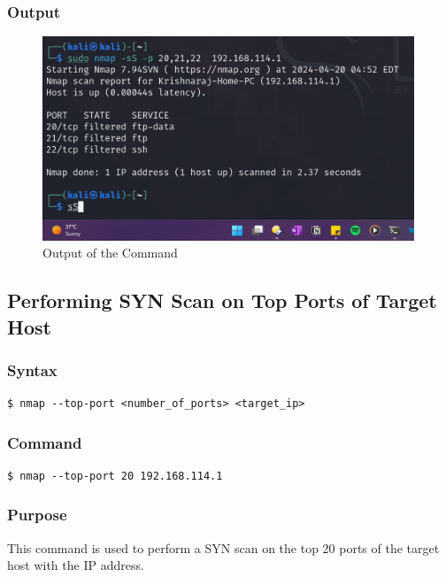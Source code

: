 \documentclass[11pt]{article}
\begin{document}
\subsubsection*{Output}
\begin{figure}[H]
    \centering
    \includegraphics[width=0.99\textwidth]{a3_ss (6).png}
    \caption{Output of the Command}
\end{figure}
\subsection{Performing SYN Scan on Top Ports of Target Host}

\subsubsection*{Syntax}
\begin{verbatim}
$ nmap --top-port <number_of_ports> <target_ip>
\end{verbatim}

\subsubsection*{Command}
\begin{verbatim} 
$ nmap --top-port 20 192.168.114.1
\end{verbatim}

\subsubsection*{Purpose}
This command is used to perform a SYN scan on the top 20 ports of the target host with the IP address.
\end{document}
